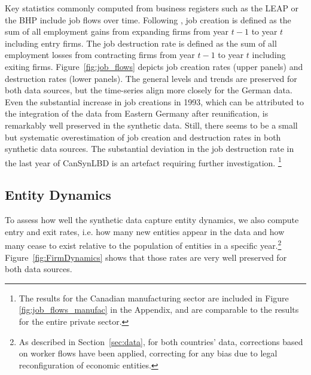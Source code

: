 Key statistics commonly computed from business registers such as the LEAP or the BHP include job flows over time. Following \citet{DavisHaltiwangerSchuh}, job creation is defined as the sum of all employment gains from expanding firms from year $t-1$ to year $t$ including entry firms. The job destruction rate is defined as the sum of all employment losses from contracting firms from year $t-1$ to year $t$ including exiting firms. Figure~\ref{fig:job_flows} depicts  job creation rates (upper panels) and destruction rates (lower panels). The general levels and trends are preserved for both data sources, but the time-series align more closely for the German data. Even the substantial increase in job creations in 1993, which can be attributed to the integration of the data from Eastern Germany after reunification, is remarkably well preserved in the synthetic data. Still, there seems to be a small but systematic overestimation of job creation and destruction rates in both synthetic data sources. The substantial deviation in the job destruction rate in the last year of CanSynLBD is an artefact  requiring further investigation.%
\footnote{The results for the Canadian manufacturing sector are included in Figure \ref{fig:job_flows_manufac} in the Appendix, and are comparable to the results for the entire private sector.}




\subsection{Entity Dynamics}


To assess how well the synthetic data capture entity dynamics, we also compute entry and exit rates, i.e. how many new entities appear in the data and how many cease to exist relative to the population of entities in a specific year.\footnote{As described in Section~\ref{sec:data}, for both countries' data, corrections based on worker flows have been applied, correcting for any bias due to legal reconfiguration of economic entities.} Figure~\ref{fig:FirmDynamics} shows that those rates are very well preserved for both data sources. 

